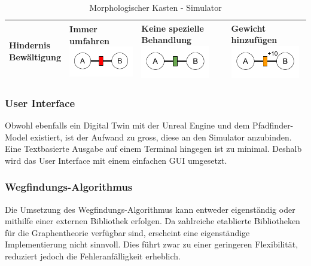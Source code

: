 \documentclass[../main.tex]{subfiles}
\begin{document}
\begin{table}[htbp!]
\begin{tabularx}{\textwidth}{| X | Y | Y | Y |}
        \textbf{Hindernis \newline Bewältigung}   &     
        Immer umfahren \newline
        \includegraphics[width=3cm]{img/simulation/morphologischer-kasten/hindernis-umfahren.png}
        &
        Keine spezielle Behandlung \newline
        \includegraphics[width=3cm]{img/simulation/morphologischer-kasten/hindernis-ignoriert.png}
        &
        Gewicht hinzufügen\newline
        \includegraphics[width=3cm]{img/simulation/morphologischer-kasten/hindernis-gewicht.png}
        \\ \hline
    \end{tabularx}
    \caption{Morphologischer Kasten - Simulator}
    \label{tab:sim_Morphologischer_Kasten}
\end{table}

\subsubsection{User Interface}

Obwohl ebenfalls ein Digital Twin mit der Unreal Engine und dem Pfadfinder-Model existiert, ist der Aufwand zu gross, diese an den Simulator anzubinden. Eine Textbasierte Ausgabe auf einem Terminal hingegen ist zu minimal. Deshalb wird das User Interface mit einem einfachen GUI umgesetzt. 

\subsubsection{Wegfindungs-Algorithmus}

Die Umsetzung des Wegfindungs-Algorithmus kann entweder eigenständig oder mithilfe einer externen Bibliothek erfolgen. Da zahlreiche etablierte Bibliotheken für die Graphentheorie verfügbar sind, erscheint eine eigenständige Implementierung nicht sinnvoll. Dies führt zwar zu einer geringeren Flexibilität, reduziert jedoch die Fehleranfälligkeit erheblich.
\end{document}
